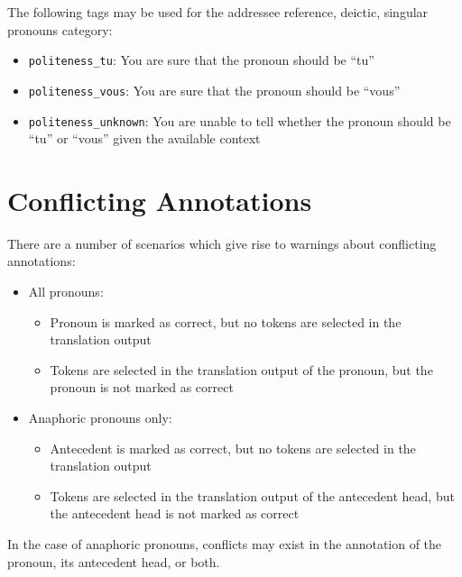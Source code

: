 \documentclass[11pt]{article} %
\newcommand\tag[1]{\texttt{#1}}
\begin{document}
The following tags may be used for the addressee reference, deictic, singular pronouns category:

\begin{itemize}  
  \item \tag{politeness\_tu}: You are sure that the pronoun should be ``tu''
  \item \tag{politeness\_vous}: You are sure that the pronoun should be ``vous''
  \item \tag{politeness\_unknown}: You are unable to tell whether the pronoun should be ``tu'' or ``vous'' given the available context
\end{itemize}


\section{Conflicting Annotations}
\label{ConflictingAnnotations}
There are a number of scenarios which give rise to warnings about conflicting annotations:
\begin{itemize}
  \item All pronouns:
  \begin{itemize}
    \item Pronoun is marked as correct, but no tokens are selected in the translation output
    \item Tokens are selected in the translation output of the pronoun, but the pronoun is not marked as correct
  \end{itemize}
  \item Anaphoric pronouns only:
  \begin{itemize}
    \item Antecedent is marked as correct, but no tokens are selected in the translation output
    \item Tokens are selected in the translation output of the antecedent head, but the antecedent head is not marked as correct 
  \end{itemize}
\end{itemize}

In the case of anaphoric pronouns, conflicts may exist in the annotation of the pronoun, its antecedent head, or both.
\end{document}

